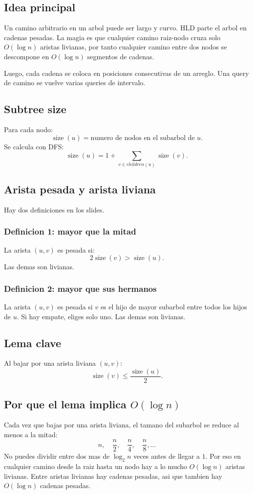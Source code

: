 \documentclass[10pt]{article}
\newcommand{\bigO}{O}
\newcommand{\size}{\operatorname{size}}
\begin{document}
\subsection{Idea principal}
Un camino arbitrario en un arbol puede ser largo y curvo. HLD parte el arbol en
cadenas pesadas. La magia es que cualquier camino raiz-nodo cruza solo
$\bigO(\log n)$ aristas livianas, por tanto cualquier camino entre dos nodos se
descompone en $\bigO(\log n)$ segmentos de cadenas.

Luego, cada cadena se coloca en posiciones consecutivas de un arreglo. Una query
de camino se vuelve varias queries de intervalo.

\subsection{Subtree size}
Para cada nodo:
\[
\size(u)=\text{numero de nodos en el subarbol de }u.
\]
Se calcula con DFS:
\[
\size(u)=1+\sum_{v\in children(u)}\size(v).
\]

\subsection{Arista pesada y arista liviana}
Hay dos definiciones en los slides.

\subsubsection*{Definicion 1: mayor que la mitad}
La arista $(u,v)$ es pesada si:
\[
2\size(v)>\size(u).
\]
Las demas son livianas.

\subsubsection*{Definicion 2: mayor que sus hermanos}
La arista $(u,v)$ es pesada si $v$ es el hijo de mayor subarbol entre todos los
hijos de $u$. Si hay empate, eliges solo uno. Las demas son livianas.

\subsection{Lema clave}
Al bajar por una arista liviana $(u,v)$:
\[
\size(v)\le \frac{\size(u)}2.
\]

\subsection{Por que el lema implica $\bigO(\log n)$}
Cada vez que bajas por una arista liviana, el tamano del subarbol se reduce al
menos a la mitad:
\[
n,\quad \frac n2,\quad \frac n4,\quad \frac n8,\ldots
\]
No puedes dividir entre dos mas de $\log_2 n$ veces antes de llegar a $1$. Por
eso en cualquier camino desde la raiz hasta un nodo hay a lo mucho
$\bigO(\log n)$ aristas livianas. Entre aristas livianas hay cadenas pesadas,
asi que tambien hay $\bigO(\log n)$ cadenas pesadas.
\end{document}
